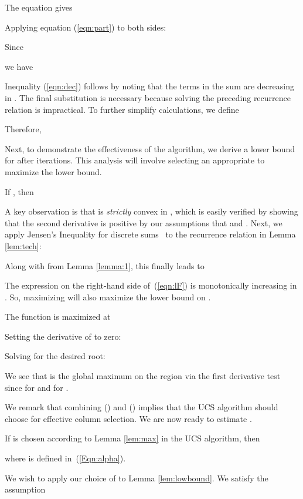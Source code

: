 \documentclass[final,leqno,onefignum,onetabnum]{siamltex1213}
\begin{document}
The equation  gives

Applying equation (\ref{eqn:part}) to both sides:

Since 

we have

Inequality (\ref{eqn:dec}) follows by noting that the
terms in the sum are decreasing in .  The final
substitution is necessary because solving the preceding recurrence
relation is impractical.  To further simplify calculations, we define

Therefore,


Next, to demonstrate the effectiveness of the algorithm, we derive a lower bound for  after  iterations.  This analysis will
involve selecting an appropriate  to maximize the lower bound.
\begin{lemma} \label{lem:lowbound}
If , then 

\end{lemma}
\proof A key observation is that  is \emph{strictly} convex in ,
which is easily verified by showing that the second derivative
 is positive by our assumptions that
 and . Next, we apply Jensen's
Inequality for discrete sums~\cite{zorich} to the recurrence relation in Lemma \ref{lem:tech}:

Along with  from Lemma \ref{lemma:1},  this finally leads to 
 
The expression on the right-hand side of~(\ref{eqn:lF}) is monotonically increasing
in . So, maximizing  will also
maximize the lower bound on .
\begin{lemma} \label{lem:max}
The function  is maximized at

\end{lemma}
\proof
Setting the derivative of  to zero:

Solving for the desired root:

We see that  is the global maximum on the region  via the first derivative test since  for  and  for .
\hspace{2 em}\endproof

We remark that combining () and () implies that the UCS algorithm should choose 
 for effective column selection. We are now ready to estimate .
\begin{theorem} \label{thm:lower}
If  is chosen according to Lemma \ref{lem:max} in the UCS algorithm, then

where  is defined in~(\ref{Eqn:alpha}).
\end{theorem} 
\proof We wish to apply our choice of  to Lemma \ref{lem:lowbound}. We satisfy the assumption
\end{document}
